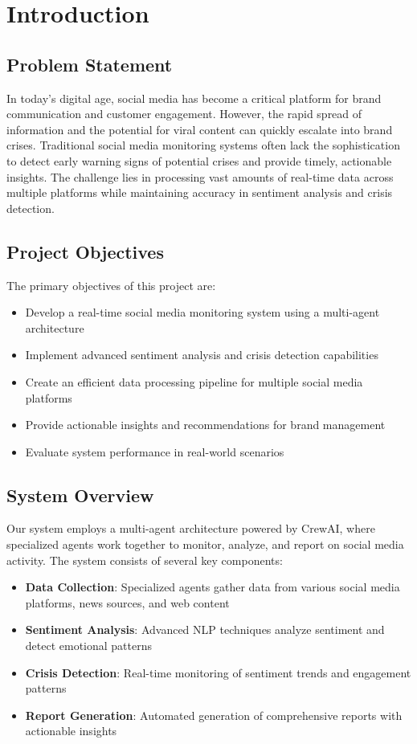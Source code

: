 \section{Introduction}

\subsection{Problem Statement}
In today's digital age, social media has become a critical platform for brand communication and customer engagement. However, the rapid spread of information and the potential for viral content can quickly escalate into brand crises. Traditional social media monitoring systems often lack the sophistication to detect early warning signs of potential crises and provide timely, actionable insights. The challenge lies in processing vast amounts of real-time data across multiple platforms while maintaining accuracy in sentiment analysis and crisis detection.

\subsection{Project Objectives}
The primary objectives of this project are:
\begin{itemize}
    \item Develop a real-time social media monitoring system using a multi-agent architecture
    \item Implement advanced sentiment analysis and crisis detection capabilities
    \item Create an efficient data processing pipeline for multiple social media platforms
    \item Provide actionable insights and recommendations for brand management
    \item Evaluate system performance in real-world scenarios
\end{itemize}

\subsection{System Overview}
Our system employs a multi-agent architecture powered by CrewAI, where specialized agents work together to monitor, analyze, and report on social media activity. The system consists of several key components:

\begin{itemize}
    \item \textbf{Data Collection}: Specialized agents gather data from various social media platforms, news sources, and web content
    \item \textbf{Sentiment Analysis}: Advanced NLP techniques analyze sentiment and detect emotional patterns
    \item \textbf{Crisis Detection}: Real-time monitoring of sentiment trends and engagement patterns
    \item \textbf{Report Generation}: Automated generation of comprehensive reports with actionable insights
\end{itemize}

